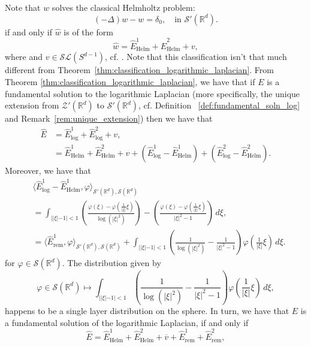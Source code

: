 \documentclass[11pt]{amsart}
\newcommand{\R}{\mathbb{R}}
\begin{document}
\begin{itemize}
Note that $w$ solves the classical Helmholtz problem:
        \begin{equation}\label{eqn:helmholtz}
        (-\Delta)w-w=\delta_0, \quad \text{in $\mathcal{S}'(\R^d).$} 
    \end{equation}
	if and only if $\hat{w}$ is of the form 
    \begin{equation*}
        \hat{w}=\hat{E}_{\text{Helm}}^{1}+\hat{E}_{\text{Helm}}^{2}+v,
    \end{equation*}
    where 
 and $v\in \mathcal{SL}(S^{d-1})$, cf. \cite[Exemple, page 128]{MR209834}. Note that this classification isn't that much different from Theorem~\ref{thm:classification_logarithmic_laplacian}.  
	From Theorem \ref{thm:classification_logarithmic_laplacian}, we have that if $E$ is a fundamental solution to the logarithmic Laplacian (more specifically, the unique extension from $\mathcal{Z}'(\R^d)$ to $\mathcal{S}'(\R^d)$, cf. Definition ~\ref{def:fundamental_soln_log} and Remark~\ref{rem:unique_extension}) then we have that
\begin{equation*}
        \begin{split}
		\hat{E}&=\hat{E}^1_{\log}+\hat{E}^2_{\log}+v,\\
		&=\hat{E}^1_{\text{Helm}}+\hat{E}^2_{\text{Helm}}+v+(\hat{E}^1_{\log}-\hat{E}^1_{\text{Helm}})+(\hat{E}^2_{\log}-\hat{E}^2_{\text{Helm}}).  
		\end{split}
\end{equation*}
Moreover, we have that 
\begin{equation}\label{eqn:important_comp}
    \begin{split}
        &\langle\hat{E}^{1}_{\log}-\hat{E}^{1}_{\text{Helm}},\varphi\rangle_{\mathcal{S}'(\R^d),\mathcal{S}(\R^d)}\\
    &=\int_{||\xi|-1|<1}\left (\frac{\varphi(\xi)-\varphi(\frac{1}{|\xi|}\xi)}{\log(|\xi|^2)}\right )-\left (\frac{\varphi(\xi)-\varphi(\frac{1}{|\xi|}\xi)}{|\xi|^2-1}\right )\,d\xi,\\
    &=\langle \hat{E}_{\text{rem}}^{1},\varphi\rangle_{\mathcal{S}'(\R^d),\mathcal{S}(\R^d)}+\int_{||\xi|-1|<1}\left (\frac{1}{\log(|\xi|^2)}-\frac{1}{|\xi|^2-1}\right )\varphi\left (\frac{1}{|\xi|}\xi\right )\,d\xi.
    \end{split}
\end{equation}
for $\varphi \in \mathcal{S}(\R^d)$. The distribution given by 
\begin{equation*}
    \varphi \in \mathcal{S}(\R^d)\mapsto \int_{||\xi|-1|<1}\left (\frac{1}{\log(|\xi|^2)}-\frac{1}{|\xi|^2-1}\right )\varphi\left (\frac{1}{|\xi|}\xi\right )\,d\xi,
\end{equation*}
happens to be a single layer distribution on the sphere. 
In turn, we have that $E$ is a fundamental solution of the logarithmic Laplacian, if and only if 
\begin{equation*}
	\hat{E}=\hat{E}^1_{\text{Helm}}+\hat{E}^2_{\text{Helm}}+\overline{v}+\hat{E}^1_{\text{rem}}+\hat{E}^2_{\text{rem}},
\end{equation*}
		

\end{itemize}
\end{document}
